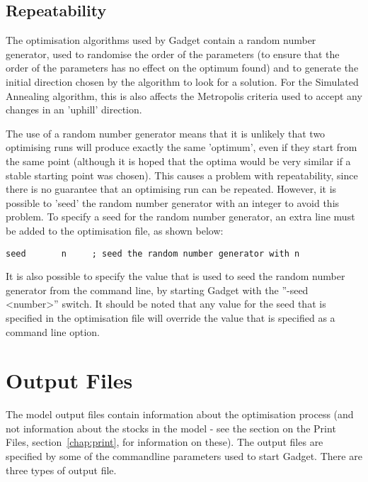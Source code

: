 \documentclass[10pt,twoside]{book}
\begin{document}
\section{Repeatability}\label{sec:repeat}
The optimisation algorithms used by Gadget contain a random number generator, used to randomise the order of the parameters (to ensure that the order of the parameters has no effect on the optimum found) and to generate the initial direction chosen by the algorithm to look for a solution.  For the Simulated Annealing algorithm, this is also affects the Metropolis criteria used to accept any changes in an 'uphill' direction.

\bigskip
The use of a random number generator means that it is unlikely that two optimising runs will produce exactly the same 'optimum', even if they start from the same point (although it is hoped that the optima would be very similar if a stable starting point was chosen).  This causes a problem with repeatability, since there is no guarantee that an optimising run can be repeated.  However, it is possible to 'seed' the random number generator with an integer to avoid this problem.  To specify a seed for the random number generator, an extra line must be added to the optimisation file, as shown below:

{\small\begin{verbatim}
seed       n     ; seed the random number generator with n
\end{verbatim}}

It is also possible to specify the value that is used to seed the random number generator from the command line, by starting Gadget with the ''-seed <number>'' switch.  It should be noted that any value for the seed that is specified in the optimisation file will override the value that is specified as a command line option.

\chapter{Output Files}\label{chap:output}
The model output files contain information about the optimisation process (and not information about the stocks in the model - see the section on the Print Files, section~\ref{chap:print}, for information on these).  The output files are specified by some of the commandline parameters used to start Gadget.  There are three types of output file.
\end{document}
